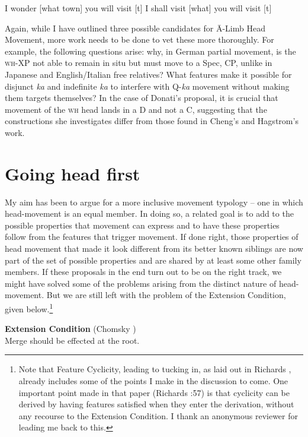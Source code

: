 \documentclass[output=paper,colorlinks,citecolor=brown,
]{langscibook}
\begin{document}
\ea 
    \ex I wonder [what town] you will visit [t]
    \ex I shall visit [what] you will visit [t]
    \z
\z

Again, while I have outlined three possible candidates for \=A-Limb Head Movement, more work needs to be done to vet these more thoroughly.  For example, the following questions arise: why, in German partial movement, is the \textsc{wh}-XP not able to remain in situ but must move to a Spec, CP, unlike in Japanese and English/Italian free relatives? What features make it possible for disjunct \textit{ka} and indefinite \textit{ka} to interfere with Q-\textit{ka} movement without making them targets themselves?  In the case of Donati's proposal, it is crucial that movement of the \textsc{wh} head lands in a D and not a C, suggesting that the constructions she investigates differ from those found in Cheng's and Hagstrom's work.

\section{Going head first}

My aim has been to argue for a more inclusive movement typology -- one in which head-movement is an equal member.  In doing so, a related goal is to add to the possible properties that movement can express and to have these properties follow from the features that trigger movement.  If done right, those properties of head movement that made it look different from its better known siblings are now part of the set of possible properties and are shared by at least some other family members.  If these proposals in the end turn out to be on the right track, we might have solved  some of the problems arising from the distinct nature of head-movement.  But we are still left with the problem of the Extension Condition, given below.\footnote{Note that Feature Cyclicity, leading to tucking in, as laid out in Richards \citeyearpar{Richards:1997a}, already includes some of the points I make in the discussion to come.  One important point made in that paper (Richards \citeyear{Richards:1997a}:57) is that cyclicity can be derived by having features satisfied when they enter the derivation, without any recourse to the Extension Condition.  I thank an anonymous reviewer for leading me back to this.} 

\ea \textbf{Extension Condition} (Chomsky \citeyear{Chomsky:1995})\\
Merge should be effected at the root.
\z
\end{document}

